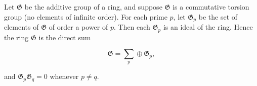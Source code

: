 Let $\mathfrak{G}$ be the additive group of a ring, and suppose $\mathfrak{G}$ is a commutative torsion group (no elements of infinite order). For each prime $p$, let $\mathfrak{G}_p$ be the set of elements of $\mathfrak{G}$ of order a power of $p$. Then each $\mathfrak{G}_p$ is an ideal of the ring. Hence the ring $\mathfrak{G}$ is the direct sum

$$\mathfrak{G} = \sum_p \oplus \mathfrak{G}_p,$$

and $\mathfrak{G}_p \mathfrak{G}_q = 0$ whenever $p \neq q$.
